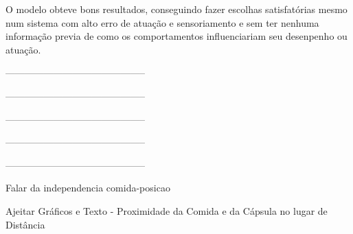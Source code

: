 O modelo obteve bons resultados, conseguindo fazer escolhas satisfatórias mesmo num sistema com alto erro de atuação e sensoriamento e sem ter nenhuma informação previa de como os comportamentos influenciariam seu desenpenho ou atuação.






--------------------------------------------

--------------------------------------------

--------------------------------------------

--------------------------------------------

--------------------------------------------


Falar da independencia comida-posicao

Ajeitar Gráficos e Texto - Proximidade da Comida e da Cápsula no lugar de Distância